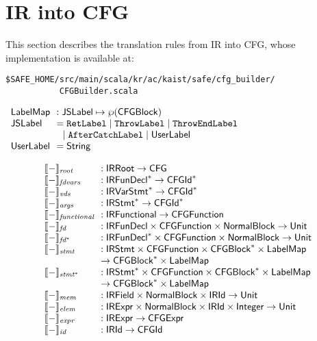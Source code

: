 \chapter{IR into CFG}
This section describes the \safe translation rules from IR into CFG,
whose implementation is available at:
\begin{verbatim}
$SAFE_HOME/src/main/scala/kr/ac/kaist/safe/cfg_builder/
           CFGBuilder.scala
\end{verbatim}

\noindent
$
\begin{array}{l@{~~}l}
\LabelMap &: \JSLabel \mapsto \powerset{\CFGBlock}\\
\JSLabel &= \RetLabel \mid \ThrowLabel \mid \ThrowEndLabel \\
& \ \ \mid \AfterCatchLabel \mid \UserLabel\\
\UserLabel &= \String\\
\end{array}
$

\[
\begin{array}{l@{~~}l}
\transfun{-}_{\emph{root}} &: \IRRoot \rightarrow \CFG \\
\transfun{-}_{\emph{fdvars}} &: \IRFunDecl^{*} \rightarrow \CFGId^{*} \\
\transfun{-}_{\emph{vds}} &: \IRVarStmt^{*} \rightarrow \CFGId^{*} \\
\transfun{-}_{\emph{args}} &: \IRStmt^{*} \rightarrow \CFGId^{*} \\
\transfun{-}_{\emph{functional}} &: \IRFunctional \rightarrow \CFGFunction \\
\transfun{-}_{\emph{fd}} &: \IRFunDecl \times \CFGFunction \times \NormalBlock \rightarrow \Unit \\
\transfun{-}_{\emph{fd}^{*}} &: \IRFunDecl^{*} \times \CFGFunction \times \NormalBlock \rightarrow \Unit \\
\transfun{-}_{\emph{stmt}} &: \IRStmt \times \CFGFunction \times \CFGBlock^{*} \times \LabelMap\\
& \rightarrow \CFGBlock^{*} \times \LabelMap\\
\transfun{-}_{\emph{stmt}^{*}} &: \IRStmt^{*} \times \CFGFunction \times \CFGBlock^{*} \times \LabelMap\\
& \rightarrow \CFGBlock^{*} \times \LabelMap\\
\transfun{-}_{\emph{mem}} &: \IRField \times \NormalBlock \times \IRId \rightarrow \Unit \\
\transfun{-}_{\emph{elem}} &: \IRExpr \times \NormalBlock \times \IRId \times \Integer \rightarrow \Unit \\
\transfun{-}_{\emph{expr}} &: \IRExpr \rightarrow \CFGExpr \\
\transfun{-}_{\emph{id}} &: \IRId \rightarrow \CFGId \\
\end{array}
\]

